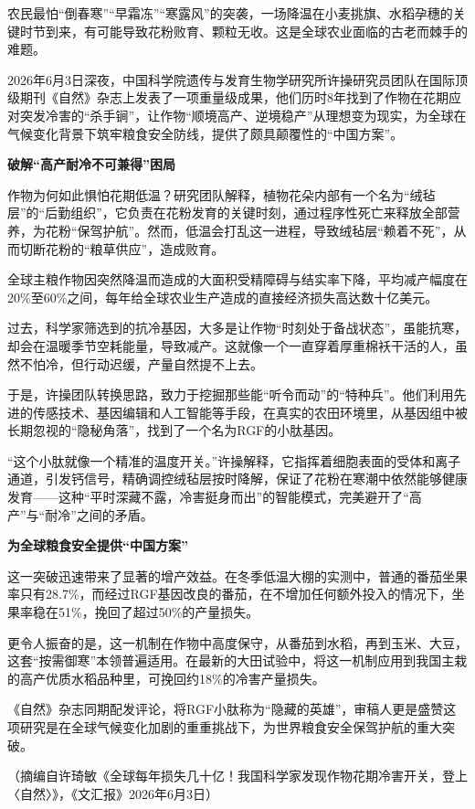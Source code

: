 \documentclass[11pt,a4paper]{ctexart}
\begin{document}
\begin{materialtext}
农民最怕“倒春寒”“早霜冻”“寒露风”的突袭，一场降温在小麦挑旗、水稻孕穗的关键时节到来，有可能导致花粉败育、颗粒无收。这是全球农业面临的古老而棘手的难题。

2026年6月3日深夜，中国科学院遗传与发育生物学研究所许操研究员团队在国际顶级期刊《自然》杂志上发表了一项重量级成果，他们历时8年找到了作物在花期应对突发冷害的“杀手锏”，让作物“顺境高产、逆境稳产”从理想变为现实，为全球在气候变化背景下筑牢粮食安全防线，提供了颇具颠覆性的“中国方案”。

\begin{center}{\bfseries 破解“高产耐冷不可兼得”困局}\par\end{center}

作物为何如此惧怕花期低温？研究团队解释，植物花朵内部有一个名为“绒毡层”的“后勤组织”，它负责在花粉发育的关键时刻，通过程序性死亡来释放全部营养，为花粉“保驾护航”。然而，低温会打乱这一进程，导致绒毡层“赖着不死”，从而切断花粉的“粮草供应”，造成败育。

全球主粮作物因突然降温而造成的大面积受精障碍与结实率下降，平均减产幅度在20\%至60\%之间，每年给全球农业生产造成的直接经济损失高达数十亿美元。

过去，科学家筛选到的抗冷基因，大多是让作物“时刻处于备战状态”，虽能抗寒，却会在温暖季节空耗能量，导致减产。这就像一个一直穿着厚重棉袄干活的人，虽然不怕冷，但行动迟缓，产量自然提不上去。

于是，许操团队转换思路，致力于挖掘那些能“听令而动”的“特种兵”。他们利用先进的传感技术、基因编辑和人工智能等手段，在真实的农田环境里，从基因组中被长期忽视的“隐秘角落”，找到了一个名为RGF的小肽基因。

“这个小肽就像一个精准的温度开关。”许操解释，它指挥着细胞表面的受体和离子通道，引发钙信号，精确调控绒毡层按时降解，保证了花粉在寒潮中依然能够健康发育——这种“平时深藏不露，冷害挺身而出”的智能模式，完美避开了“高产”与“耐冷”之间的矛盾。

\begin{center}{\bfseries 为全球粮食安全提供“中国方案”}\par\end{center}

这一突破迅速带来了显著的增产效益。在冬季低温大棚的实测中，普通的番茄坐果率只有28.7\%，而经过RGF基因改良的番茄，在不增加任何额外投入的情况下，坐果率稳在51\%，挽回了超过50\%的产量损失。

更令人振奋的是，这一机制在作物中高度保守，从番茄到水稻，再到玉米、大豆，这套“按需御寒”本领普遍适用。在最新的大田试验中，将这一机制应用到我国主栽的高产优质水稻品种里，可挽回约18\%的冷害产量损失。

《自然》杂志同期配发评论，将RGF小肽称为“隐藏的英雄”，审稿人更是盛赞这项研究是在全球气候变化加剧的重重挑战下，为世界粮食安全保驾护航的重大突破。
\end{materialtext}
\begin{flushright}（摘编自许琦敏《全球每年损失几十亿！我国科学家发现作物花期冷害开关，登上〈自然〉》，《文汇报》2026年6月3日）\end{flushright}
\end{document}
